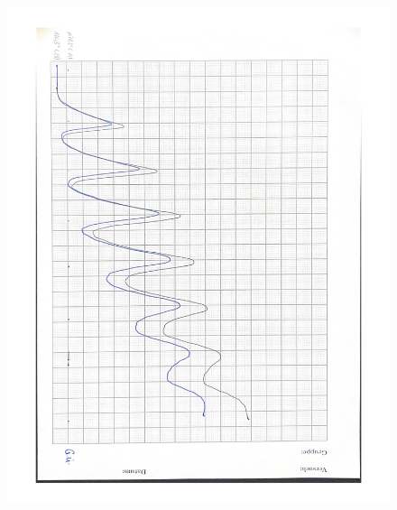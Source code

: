 \begin{figure}[H]
    \centering
    \includegraphics[height=185mm]{bilder/Anh2.pdf}
    \caption{\label{Abbildung7} }
\end{figure}